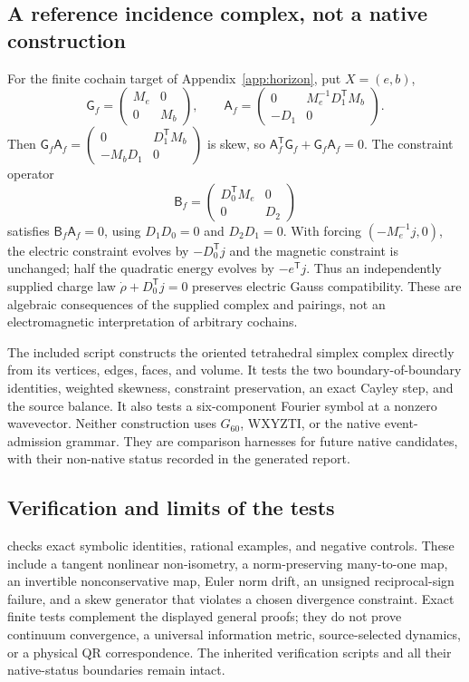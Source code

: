 \subsection{A reference incidence complex, not a native construction}
For the finite cochain target of Appendix~\ref{app:horizon}, put $X=(e,b)$,
\[
\mathsf G_f=\begin{pmatrix}M_e&0\\0&M_b\end{pmatrix},\qquad
\mathsf A_f=\begin{pmatrix}
0&M_e^{-1}D_1^{\mathsf T}M_b\\-D_1&0
\end{pmatrix}.
\]
Then $\mathsf G_f\mathsf A_f=\left(\begin{smallmatrix}0&D_1^{\mathsf T}M_b\\-M_bD_1&0\end{smallmatrix}\right)$ is skew, so $\mathsf A_f^{\mathsf T}\mathsf G_f+\mathsf G_f\mathsf A_f=0$. The constraint operator
\[
\mathsf B_f=
\begin{pmatrix}D_0^{\mathsf T}M_e&0\\0&D_2\end{pmatrix}
\]
satisfies $\mathsf B_f\mathsf A_f=0$, using $D_1D_0=0$ and $D_2D_1=0$. With forcing $(-M_e^{-1}j,0)$, the electric constraint evolves by $-D_0^{\mathsf T}j$ and the magnetic constraint is unchanged; half the quadratic energy evolves by $-e^{\mathsf T}j$. Thus an independently supplied charge law $\dot\rho+D_0^{\mathsf T}j=0$ preserves electric Gauss compatibility. These are algebraic consequences of the supplied complex and pairings, not an electromagnetic interpretation of arbitrary cochains.

The included script constructs the oriented tetrahedral simplex complex directly from its vertices, edges, faces, and volume. It tests the two boundary-of-boundary identities, weighted skewness, constraint preservation, an exact Cayley step, and the source balance. It also tests a six-component Fourier symbol at a nonzero wavevector. Neither construction uses $G_{60}$, WXYZTI, or the native event-admission grammar. They are comparison harnesses for future native candidates, with their non-native status recorded in the generated report.

\subsection{Verification and limits of the tests}
 checks exact symbolic identities, rational examples, and negative controls. These include a tangent nonlinear non-isometry, a norm-preserving many-to-one map, an invertible nonconservative map, Euler norm drift, an unsigned reciprocal-sign failure, and a skew generator that violates a chosen divergence constraint. Exact finite tests complement the displayed general proofs; they do not prove continuum convergence, a universal information metric, source-selected dynamics, or a physical QR correspondence. The inherited verification scripts and all their native-status boundaries remain intact.
